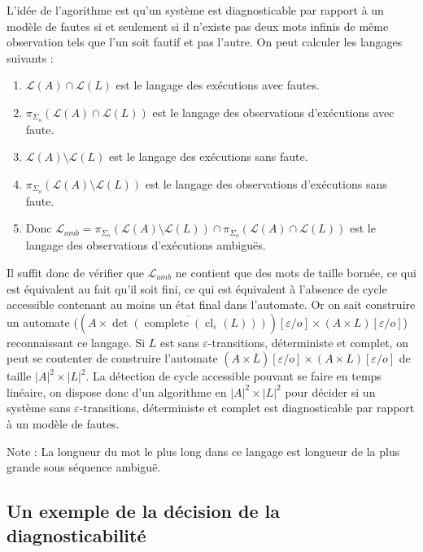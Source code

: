 \documentclass[10pt,a4paper]{article}
\begin{document}
L'id\'ee de l'agorithme est qu'un système est diagnosticable par rapport \`a un mod\`ele de fautes si et seulement si il n'existe pas deux mots infinis de même observation tels que l'un soit fautif et pas l'autre.
On peut calculer les langages suivants :
\begin{enumerate} 
  \item $\mathcal L (A) \cap \mathcal L(L)$ est le langage des ex\'ecutions avec fautes.
  \item $\pi_{\Sigma_o}(\mathcal L (A) \cap \mathcal L(L))$ est le langage des observations d'ex\'ecutions avec faute.
  \item $\mathcal L(A) \setminus \mathcal L(L)$ est le langage des ex\'ecutions sans faute.
  \item $\pi_{\Sigma_o}(\mathcal L(A) \setminus \mathcal L(L))$ est le langage des observations d'ex\'ecutions sans faute.
  \item Donc $ \mathcal L_{amb} = \pi_{\Sigma_o}(\mathcal L(A) \setminus \mathcal L(L)) \cap \pi_{\Sigma_o}(\mathcal L (A) \cap \mathcal L(L))$ est le langage des observations d'ex\'ecutions ambiguës.
\end{enumerate}

Il suffit donc de v\'erifier que $\mathcal L_{amb}$ ne contient que des mots de taille born\'ee, ce qui est équivalent au fait qu'il soit fini, ce qui est \'equivalent \`a l'absence de cycle accessible contenant au moins un \'etat final dans l'automate. Or on sait construire un automate ($(A\times \overline{\det(\operatorname{complete}(\operatorname{cl}_\varepsilon(L)))})[\varepsilon/o] \times (A\times L)[\varepsilon/o]$) reconnaissant ce langage. Si $L$ est sans $\varepsilon$-transitions, d\'eterministe et complet, on peut se contenter de construire l'automate $(A\times \overline{L})[\varepsilon/o] \times (A\times L)[\varepsilon/o]$ de taille $|A|^2 \times |L|^2$. La d\'etection de cycle accessible pouvant se faire en temps lin\'eaire, on dispose donc d'un algorithme en $|A|^2 \times |L|^2$ pour d\'ecider si un syst\`eme sans $\varepsilon$-transitions, d\'eterministe et complet est diagnosticable par rapport \`a un mod\`ele de fautes.

Note : La longueur du mot le plus long dans ce langage est longueur de la plus grande sous séquence ambiguë.
\subsection{Un exemple de la d\'ecision de la diagnosticabilit\'e}
\end{document}
